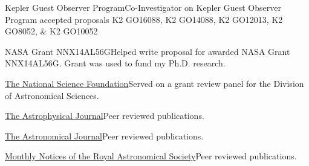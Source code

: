 \documentclass[10pt,a4paper]{article}
\begin{document}

\inlineheadsection
  {Kepler Guest Observer Program}{Co-Investigator on Kepler Guest Observer Program accepted proposals K2 GO16088, K2 GO14088, K2 GO12013, K2 GO8052, \& K2 GO10052}

\inlineheadsection
  {NASA Grant NNX14AL56G}{Helped write proposal for awarded NASA Grant NNX14AL56G. Grant was used to fund my Ph.D. research.}




\inlineheadsection
  {\href{https://www.nsf.gov/}{The National Science Foundation}}{Served on a grant review panel for the Division of Astronomical Sciences.}

\inlineheadsection
  {\href{http://iopscience.iop.org/journal/0004-637X}{The Astrophysical Journal}}{Peer reviewed publications.}

\inlineheadsection
  {\href{https://iopscience.iop.org/journal/1538-3881}{The Astronomical Journal}}{Peer reviewed publications.}

\inlineheadsection
  {\href{https://academic.oup.com/mnras}{Monthly Notices of the Royal Astronomical Society}}{Peer reviewed publications.}






\end{document}
